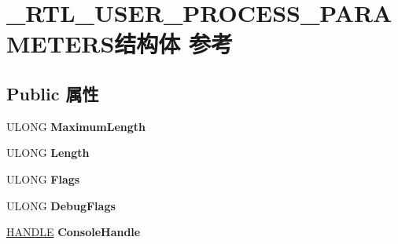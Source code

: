 \hypertarget{struct___r_t_l___u_s_e_r___p_r_o_c_e_s_s___p_a_r_a_m_e_t_e_r_s}{}\section{\+\_\+\+R\+T\+L\+\_\+\+U\+S\+E\+R\+\_\+\+P\+R\+O\+C\+E\+S\+S\+\_\+\+P\+A\+R\+A\+M\+E\+T\+E\+R\+S结构体 参考}
\label{struct___r_t_l___u_s_e_r___p_r_o_c_e_s_s___p_a_r_a_m_e_t_e_r_s}
\subsection*{Public 属性}
\begin{DoxyCompactItemize}
\item 
\mbox{\label{struct___r_t_l___u_s_e_r___p_r_o_c_e_s_s___p_a_r_a_m_e_t_e_r_s_a404babcee6ec2d0c282c5b1c53f0f694}} 
U\+L\+O\+NG {\bfseries Maximum\+Length}
\item 
\mbox{\label{struct___r_t_l___u_s_e_r___p_r_o_c_e_s_s___p_a_r_a_m_e_t_e_r_s_acdc81957777f8072c96d7a70e1dc863c}} 
U\+L\+O\+NG {\bfseries Length}
\item 
\mbox{\label{struct___r_t_l___u_s_e_r___p_r_o_c_e_s_s___p_a_r_a_m_e_t_e_r_s_aafa54b4f20f2d70051f2d4f9ce26ea66}} 
U\+L\+O\+NG {\bfseries Flags}
\item 
\mbox{\label{struct___r_t_l___u_s_e_r___p_r_o_c_e_s_s___p_a_r_a_m_e_t_e_r_s_a5cd02025dad2017c93b4ec78df7b9cee}} 
U\+L\+O\+NG {\bfseries Debug\+Flags}
\item 
\mbox{\label{struct___r_t_l___u_s_e_r___p_r_o_c_e_s_s___p_a_r_a_m_e_t_e_r_s_a1fe817ef1d78d6aac19195c133548e00}} 
\hyperlink{interfacevoid}{H\+A\+N\+D\+LE} {\bfseries Console\+Handle}
\item 
\mbox{\label{struct___r_t_l___u_s_e_r___p_r_o_c_e_s_s___p_a_r_a_m_e_t_e_r_s_a9419329f93e164df4f527bc06ef7daf1}} 

\end{DoxyCompactItemize}
